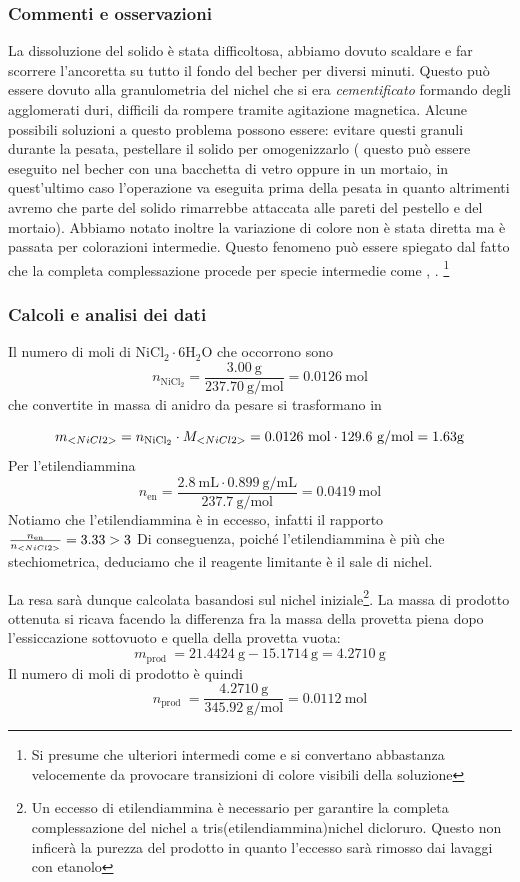 \subsubsection{Commenti e osservazioni}
La dissoluzione del solido è stata difficoltosa, abbiamo dovuto scaldare e far scorrere l'ancoretta su tutto il fondo del becher per diversi minuti. Questo può essere dovuto alla granulometria del nichel che si era \textit{cementificato} formando degli agglomerati duri, difficili da rompere tramite agitazione magnetica. Alcune possibili soluzioni a questo problema possono essere: evitare questi granuli durante la pesata, pestellare il solido per omogenizzarlo ( questo può essere eseguito nel becher con una bacchetta di vetro oppure in un mortaio, in quest'ultimo caso l'operazione va eseguita prima della pesata in quanto altrimenti avremo che parte del solido rimarrebbe attaccata alle pareti del pestello e del mortaio).
Abbiamo notato inoltre la variazione di colore non è stata diretta ma è passata per colorazioni intermedie. Questo fenomeno può essere spiegato dal fatto che la completa complessazione procede per specie intermedie come , . \footnote{Si presume che ulteriori intermedi come  e   si convertano abbastanza velocemente da provocare transizioni di colore visibili della soluzione   }


\subsubsection{Calcoli e analisi dei dati}

Il numero di moli di $\mathrm{NiCl}_2 \cdot 6 \mathrm{H}_2 \mathrm{O}$ che occorrono sono
$$
n_{\mathrm{NiCl}_2}=\frac{3.00 \mathrm{~g}}{237.70 \mathrm{~g} / \mathrm{mol}}=0.0126 \mathrm{~mol}
$$
che convertite in massa di  anidro da pesare si trasformano in

\[  {m_{\ce{NiCl2}}} = n_{\mathrm{NiCl}_2} \cdot {M_{\ce{NiCl2}}} = 0.0126 \mathrm{~mol} \cdot 129.6  \ \text{g/mol} = 1.63 \text{g} \]
Per l'etilendiammina
$$
n_{\mathrm{en}}=\frac{2.8 \mathrm{~mL} \cdot 0.899 \mathrm{~g} / \mathrm{mL}}{237.7 \mathrm{~g} / \mathrm{mol}}=0.0419 \mathrm{~mol}
$$
Notiamo che l'etilendiammina è in eccesso, infatti il rapporto $\frac{n_{\text{en}}}{{n_{<NiCl2>}}} = 3.33 > 3$
Di conseguenza, poiché l'etilendiammina è più che stechiometrica, deduciamo che il reagente limitante è il sale di nichel. 

La resa sarà dunque calcolata basandosi sul nichel iniziale\footnote{Un eccesso di etilendiammina è necessario per garantire la completa complessazione del nichel a tris(etilendiammina)nichel dicloruro. Questo non inficerà la purezza del prodotto in quanto l'eccesso sarà rimosso dai lavaggi con etanolo}. 
La massa di prodotto ottenuta si ricava facendo la differenza fra la massa della provetta piena dopo l'essiccazione sottovuoto e quella della provetta vuota:
$$
m_{\text {prod }}=21.4424  \mathrm{~g}- 15.1714 \mathrm{~g}= 4.2710 \mathrm{~g}
$$
Il numero di moli di prodotto è quindi
$$
n_{\text {prod }}=\frac{4.2710 \mathrm{~g}}{345.92 \mathrm{~g} / \mathrm{mol}}=0.0112 \mathrm{~mol}$$ 

